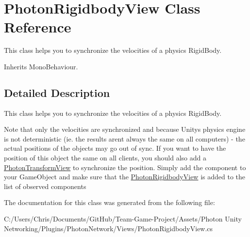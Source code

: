 \hypertarget{class_photon_rigidbody_view}{}\section{Photon\+Rigidbody\+View Class Reference}
\label{class_photon_rigidbody_view}


This class helps you to synchronize the velocities of a physics Rigid\+Body.  




Inherits Mono\+Behaviour.



\subsection{Detailed Description}
This class helps you to synchronize the velocities of a physics Rigid\+Body. 

Note that only the velocities are synchronized and because Unitys physics engine is not deterministic (ie. the results aren\textquotesingle{}t always the same on all computers) -\/ the actual positions of the objects may go out of sync. If you want to have the position of this object the same on all clients, you should also add a \hyperlink{class_photon_transform_view}{Photon\+Transform\+View} to synchronize the position. Simply add the component to your Game\+Object and make sure that the \hyperlink{class_photon_rigidbody_view}{Photon\+Rigidbody\+View} is added to the list of observed components 

The documentation for this class was generated from the following file\+:\begin{DoxyCompactItemize}
\item 
C\+:/\+Users/\+Chris/\+Documents/\+Git\+Hub/\+Team-\/\+Game-\/\+Project/\+Assets/\+Photon Unity Networking/\+Plugins/\+Photon\+Network/\+Views/Photon\+Rigidbody\+View.\+cs\end{DoxyCompactItemize}

